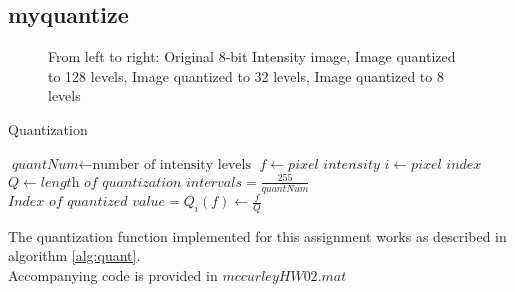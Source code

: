 \documentclass{article}[12 pt]
\begin{document}
\newpage
\subsection*{myquantize}
\begin{figure}[h!]
\captionsetup[subfloat]{labelformat=empty}
\centering
{}
\hspace{0mm}
\hspace{0mm}
\caption{From left to right: Original 8-bit Intensity image, Image quantized to 128 levels, Image quantized to 32 levels, Image quantized to 8 levels}
\end{figure}




\begin{algorithm}[H]
\caption{Quantization}\label{alg:quant}
\begin{algorithmic}[1]
\State $\textit{quantNum} \gets \text{number of intensity levels}$
\State $f \gets \textit{pixel intensity}$
\State $i \gets \textit{pixel index}$
\State $\textit{Q} \gets \textit{length of quantization intervals} = \frac{255}{quantNum}$
\State $\textit{Index of quantized value} = Q_i(f) \gets \frac{f}{Q}$
\EndFor
\EndProcedure
{}
\end{algorithmic}
\end{algorithm}
\vspace{5mm}
The quantization function implemented for this assignment works as described in algorithm \ref{alg:quant}. \\
 \vspace{10mm}
 \noindent Accompanying code is provided in $mccurleyHW02.mat$
\end{document}
